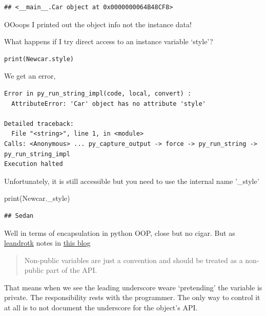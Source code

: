 \documentclass[]{book}
\newenvironment{Shaded}{\begin{snugshade}}{\end{snugshade}}
\newcommand{\BuiltInTok}[1]{#1}
\newcommand{\NormalTok}[1]{#1}
\theoremstyle{definition}
\theoremstyle{definition}
\theoremstyle{definition}
\theoremstyle{remark}
\begin{document}
\begin{verbatim}
## <__main__.Car object at 0x0000000064B48CF8>
\end{verbatim}

OOoops I printed out the object info
 not the instance data!

What happens if I try direct access to an instance variable `style'?

\begin{verbatim}
print(Newcar.style)
\end{verbatim}

We get an error,

\begin{verbatim}
Error in py_run_string_impl(code, local, convert) : 
  AttributeError: 'Car' object has no attribute 'style'

Detailed traceback: 
  File "<string>", line 1, in <module>
Calls: <Anonymous> ... py_capture_output -> force -> py_run_string -> py_run_string_impl
Execution halted
\end{verbatim}

Unfortunately, it is still accessible but you need to use the internal
name '\_style'

\begin{Shaded}
\begin{Highlighting}[]
\BuiltInTok{print}\NormalTok{(Newcar._style)}
\end{Highlighting}
\end{Shaded}

\begin{verbatim}
## Sedan
\end{verbatim}

Well in terms of encapsulation in python OOP, close but no cigar. But as
\href{https://medium.com/@leandrotk_}{leandrotk} notes in
\href{https://medium.com/the-renaissance-developer/python-101-object-oriented-programming-part-2-8e0db3ddd531}{this
blog} 

\begin{quote}
Non-public variables are just a convention and should be treated as a
non-public part of the API.
\end{quote}

That means when we see the leading underscore 
weare `pretending' the variable is private. The responsibility rests
with the programmer. The only way to control it at all is to not
document the underscore for the object's API.
\end{document}
